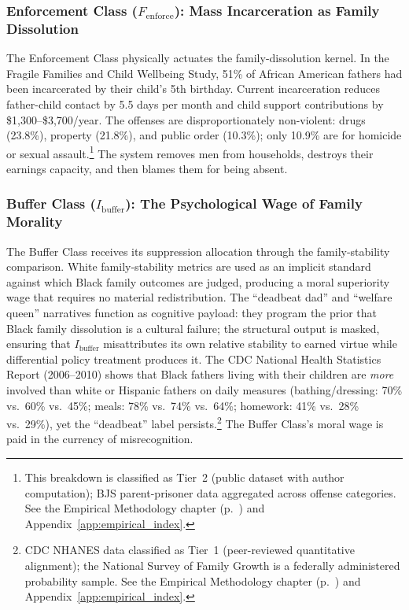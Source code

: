 \subsubsection{Enforcement Class ($F_{\text{enforce}}$): Mass Incarceration as Family Dissolution}

The Enforcement Class physically actuates the family-dissolution kernel. In the Fragile Families and Child Wellbeing Study, 51\% of African American fathers had been incarcerated by their child's 5th birthday. Current incarceration reduces father-child contact by 5.5 days per month and child support contributions by \$1,300--\$3,700/year. The offenses are disproportionately non-violent: drugs (23.8\%), property (21.8\%), and public order (10.3\%); only 10.9\% are for homicide or sexual assault.\footnote{This breakdown is classified as Tier~2 (public dataset with author computation); BJS parent-prisoner data aggregated across offense categories. See the Empirical Methodology chapter (p.~\pageref{ch:empirical_methodology}) and Appendix~\ref{app:empirical_index}.} The system removes men from households, destroys their earnings capacity, and then blames them for being absent.

\subsubsection{Buffer Class ($I_{\text{buffer}}$): The Psychological Wage of Family Morality}

The Buffer Class receives its suppression allocation through the family-stability comparison. White family-stability metrics are used as an implicit standard against which Black family outcomes are judged, producing a moral superiority wage that requires no material redistribution. The ``deadbeat dad'' and ``welfare queen'' narratives function as cognitive payload: they program the prior that Black family dissolution is a cultural failure; the structural output is masked, ensuring that $I_{\text{buffer}}$ misattributes its own relative stability to earned virtue while differential policy treatment produces it. The CDC National Health Statistics Report (2006--2010) shows that Black fathers living with their children are \textit{more} involved than white or Hispanic fathers on daily measures (bathing/dressing: 70\% vs.~60\% vs.~45\%; meals: 78\% vs.~74\% vs.~64\%; homework: 41\% vs.~28\% vs.~29\%), yet the ``deadbeat'' label persists.\footnote{CDC NHANES data classified as Tier~1 (peer-reviewed quantitative alignment); the National Survey of Family Growth is a federally administered probability sample. See the Empirical Methodology chapter (p.~\pageref{ch:empirical_methodology}) and Appendix~\ref{app:empirical_index}.} The Buffer Class's moral wage is paid in the currency of misrecognition.

